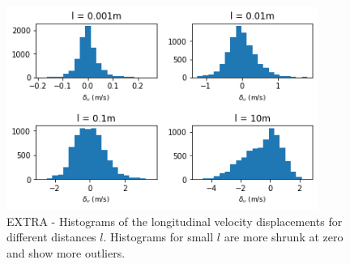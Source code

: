 \documentclass[11pt,titlepage]{article}
\begin{document}
\begin{center}
	\begin{figure} [h]
		\centering
		\includegraphics[width = 4in]{./figures/ex1_6_2.png}
		\caption{EXTRA - Histograms of the longitudinal velocity displacements for different distances $l$. Histograms for small $l$ are more shrunk at zero and show more outliers.}
		\label{fig_extra}
	\end{figure}
\end{center}
\end{document}
